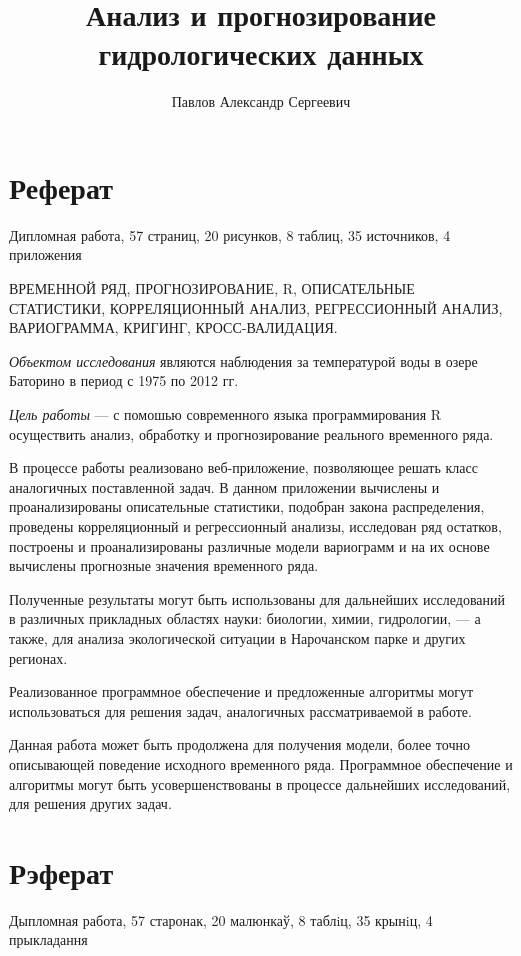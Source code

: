 \documentclass[a4paper,14pt]{extreport}
\title{Анализ и прогнозирование гидрологических данных}
\author{Павлов Александр Сергеевич}
\begin{document}

\newpage

\chapter*{Реферат}
Дипломная работа, 57 страниц, 20 рисунков, 8 таблиц, 35 источников, 4 приложения

ВРЕМЕННОЙ РЯД, ПРОГНОЗИРОВАНИЕ, R, ОПИСАТЕЛЬНЫЕ СТАТИСТИКИ, КОРРЕЛЯЦИОННЫЙ АНАЛИЗ, РЕГРЕССИОННЫЙ АНАЛИЗ, ВАРИОГРАММА, КРИГИНГ, КРОСС-ВАЛИДАЦИЯ\@.

\textit{Объектом исследования} являются наблюдения за температурой воды в озере Баторино в период с 1975 по 2012 гг.

\textit{Цель работы} --- с помошью современного языка программирования R осуществить анализ, обработку и прогнозирование реального временного ряда.

В процессе работы реализовано веб-приложение, позволяющее решать класс аналогичных поставленной задач. В данном приложении вычислены и проанализированы описательные статистики, подобран закона распределения, проведены корреляционный и регрессионный анализы, исследован ряд остатков, построены и проанализированы различные модели вариограмм и на их основе вычислены прогнозные значения временного ряда.

Полученные результаты могут быть использованы для дальнейших исследований в различных прикладных областях науки: биологии, химии, гидрологии, --- а также, для анализа экологической ситуации в Нарочанском парке и других регионах.

Реализованное программное обеспечение и предложенные алгоритмы могут использоваться для решения задач, аналогичных рассматриваемой в работе.

Данная работа может быть продолжена для получения модели, более точно описывающей поведение исходного временного ряда. Программное обеспечение и алгоритмы могут быть усовершенствованы в процессе дальнейших исследований, для решения других задач.

\newpage

\chapter*{Рэферат}
Дыпломная работа, 57 старонак, 20 малюнкаў, 8 таблiц, 35 крынiц, 4 прыкладання
\end{document}
